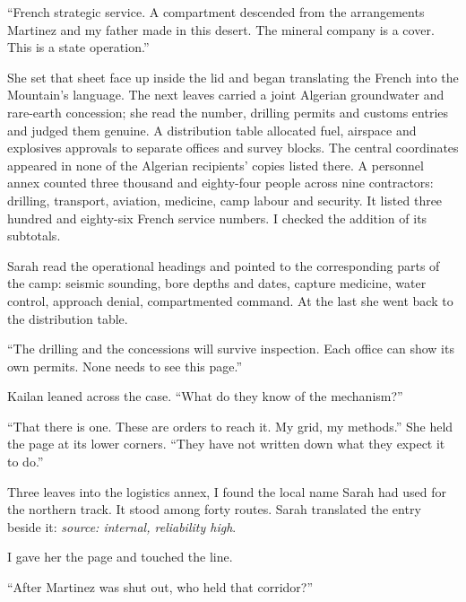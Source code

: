 ``French strategic service. A compartment descended from the arrangements Martinez and my father made in this desert. The mineral company is a cover. This is a state operation.''\par

She set that sheet face up inside the lid and began translating the French into the Mountain's language. The next leaves carried a joint Algerian groundwater and rare-earth concession; she read the number, drilling permits and customs entries and judged them genuine. A distribution table allocated fuel, airspace and explosives approvals to separate offices and survey blocks. The central coordinates appeared in none of the Algerian recipients' copies listed there. A personnel annex counted three thousand and eighty-four people across nine contractors: drilling, transport, aviation, medicine, camp labour and security. It listed three hundred and eighty-six French service numbers. I checked the addition of its subtotals.\par

Sarah read the operational headings and pointed to the corresponding parts of the camp: seismic sounding, bore depths and dates, capture medicine, water control, approach denial, compartmented command. At the last she went back to the distribution table.\par

``The drilling and the concessions will survive inspection. Each office can show its own permits. None needs to see this page.''\par

Kailan leaned across the case. ``What do they know of the mechanism?''\par

``That there is one. These are orders to reach it. My grid, my methods.'' She held the page at its lower corners. ``They have not written down what they expect it to do.''\par

Three leaves into the logistics annex, I found the local name Sarah had used for the northern track. It stood among forty routes. Sarah translated the entry beside it: \emph{source: internal, reliability high}.\par

I gave her the page and touched the line.\par

``After Martinez was shut out, who held that corridor?''\par

